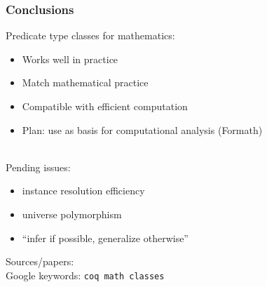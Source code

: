 \documentclass{beamer}
\begin{document}
\begin{frame}
\frametitle{Conclusions}

Predicate type classes for mathematics:
\begin{itemize}
\item Works well in practice
\item Match mathematical practice
\item Compatible with efficient computation
\item Plan: use as basis for computational analysis (Formath)
\end{itemize}

\ \\
Pending issues: %
\begin{itemize}
\item instance resolution efficiency
\item universe polymorphism
\item ``infer if possible, generalize otherwise''
\end{itemize}

% 
% 
% 

\end{frame}

\begin{frame}
{
\color{white}
Sources/papers: \\
\hspace{1cm} Google keywords: \texttt{coq math classes}
}
\end{frame}
\end{document}
